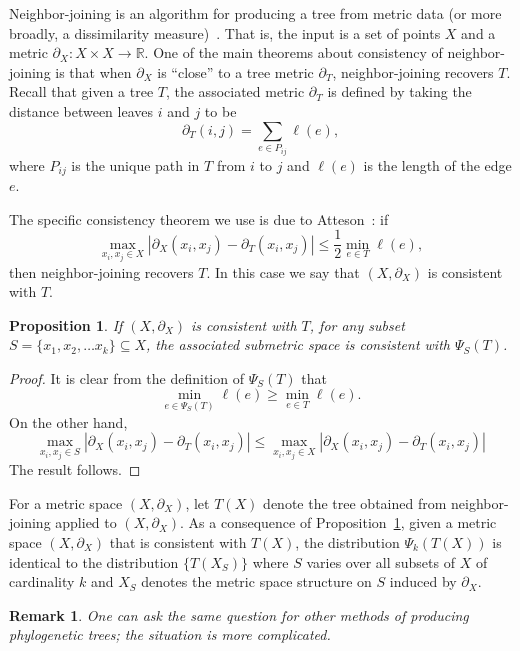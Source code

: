 \documentclass[a4paper,11pt]{article}
\newtheorem{proposition}[theorem]{Proposition}
\newtheorem{remark}[theorem]{Remark}
\begin{document}
Neighbor-joining is an algorithm for producing a tree from metric data (or more broadly, a dissimilarity measure)~\cite{felsenstein2003}.
That is, the input is a set of points $X$ and a metric $\partial_X \colon X \times X \to \mathbb{R}$.
One of the main theorems about consistency of neighbor-joining is that when $\partial_X$ is ``close'' to a tree metric $\partial_T$, neighbor-joining recovers $T$.
Recall that given a tree $T$, the associated metric $\partial_T$ is defined by taking the distance between leaves $i$ and $j$ to be 
\[
\partial_T(i,j) = \sum_{e \in P_{ij}} \ell(e),
\]
where $P_{ij}$ is the unique path in $T$ from $i$ to $j$ and $\ell(e)$ is the length of the edge $e$.

The specific consistency theorem we use is due to Atteson~\cite{atteson}: if
\[
\max_{x_i,x_j \in X} |\partial_X(x_i,x_j) - \partial_T(x_i,x_j)| \leq \frac{1}{2} \min_{e \in T} \ell(e),
\]
then neighbor-joining recovers $T$.
In this case we say that $(X, \partial_X)$ is consistent with $T$.

\begin{proposition}\label{prop:subnj}
If $(X,\partial_X)$ is consistent with $T$, for any subset $S = \{x_1, x_2, \ldots x_k\} \subseteq X$, the associated submetric space is consistent with $\Psi_S(T)$.
\end{proposition}

\begin{proof}
It is clear from the definition of $\Psi_S(T)$ that 
\[
\min_{e \in \Psi_S(T)} \ell(e) \geq \min_{e \in T} \ell(e).
\]
On the other hand, 
\[
\max_{x_i,x_j \in S} |\partial_X(x_i,x_j) - \partial_T(x_i,x_j)| \leq
\max_{x_i,x_j \in X} |\partial_X(x_i,x_j) - \partial_T(x_i,x_j)| 
\]
The result follows.
\end{proof}

For a metric space $(X,\partial_X)$, let $T(X)$ denote the tree obtained from neighbor-joining applied to $(X,\partial_X)$.
As a consequence of Proposition~\ref{prop:subnj}, given a metric space $(X, \partial_X)$ that is consistent with $T(X)$, the distribution $\Psi_k(T(X))$ is identical to the distribution $\{T(X_S)\}$ where $S$ varies over all subsets of $X$ of cardinality $k$ and $X_S$ denotes the metric space structure on $S$ induced by $\partial_X$.

\begin{remark}
One can ask the same question for other methods of producing phylogenetic trees; the situation is more complicated.
\end{remark}
\end{document}
